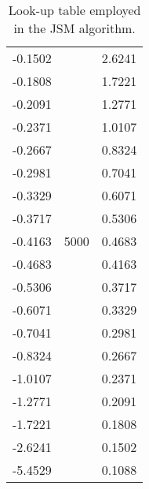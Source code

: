 \begin{apendicesenv}
\begin{table}[!ht]
\begin{threeparttable}[t]
\begin{tabular}[t]{c|c|c}
			-0.1502 &  & 2.6241\\
			
			-0.1808 &  & 1.7221 \\
			
			-0.2091 &  & 1.2771\\
			
			-0.2371 &  & 1.0107\\
			
			-0.2667 &  & 0.8324\\
			
			-0.2981 &  & 0.7041\\
			
			-0.3329 &  & 0.6071\\
			
			-0.3717 &  & 0.5306\\
			
			-0.4163 & 5000 & 0.4683 \\
			
			-0.4683 &  & 0.4163 \\
			
			-0.5306 &  & 0.3717\\
			
			-0.6071 &  & 0.3329\\
			
			-0.7041 &  & 0.2981\\
			
			-0.8324 &  & 0.2667\\
			
			-1.0107 &  & 0.2371\\
			
			-1.2771 &  & 0.2091\\
			
			-1.7221 &  & 0.1808\\
			
			-2.6241 &  & 0.1502\\
			
			-5.4529 &  & 0.1088\\
			\bottomrule
		\end{tabular}		
	\end{threeparttable}	
	\caption{Look-up table employed in the JSM algorithm.}	
	\label{Tab:LookupTable}	
\end{table}

\end{apendicesenv}
